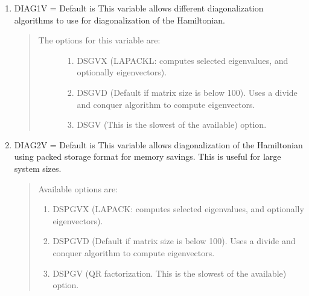 \documentclass[letterpaper,10pt,english,openany,oneside]{sphinxmanual}
\begin{document}
\begin{enumerate}
\item {} 
\sphinxAtStartPar
DIAG1V        =   Default is 
This variable allows different diagonalization algorithms to use for  diagonalization of the Hamiltonian.
\begin{quote}
\begin{description}
\item[{The options for this variable are:}] \leavevmode\begin{enumerate}
%
\setcounter{enumii}{-1}
\item {} 
\sphinxAtStartPar
DSGVX (LAPACKL: computes selected eigenvalues, and optionally eigenvectors).

\item {} 
\sphinxAtStartPar
DSGVD (Default if matrix size is below 100).  Uses a divide and conquer algorithm to compute eigenvectors.

\item {} 
\sphinxAtStartPar
DSGV   (This is the slowest of the available) option.

\end{enumerate}

\end{description}
\end{quote}

\item {} 
\sphinxAtStartPar
DIAG2V        =    Default is 
This variable allows diagonalization of the Hamiltonian using packed storage format for memory savings. This is useful for large system sizes.
\begin{quote}

\sphinxAtStartPar
Available options are:
\begin{enumerate}
%
\setcounter{enumii}{-1}
\item {} 
\sphinxAtStartPar
DSPGVX (LAPACK: computes selected eigenvalues, and optionally eigenvectors).

\item {} 
\sphinxAtStartPar
DSPGVD (Default if matrix size is below 100).  Uses a divide and conquer algorithm to compute eigenvectors.

\item {} 
\sphinxAtStartPar
DSPGV (QR\sphinxhyphen{} factorization. This is the slowest of the available) option.

\end{enumerate}


\end{quote}
\end{enumerate}
\end{document}
